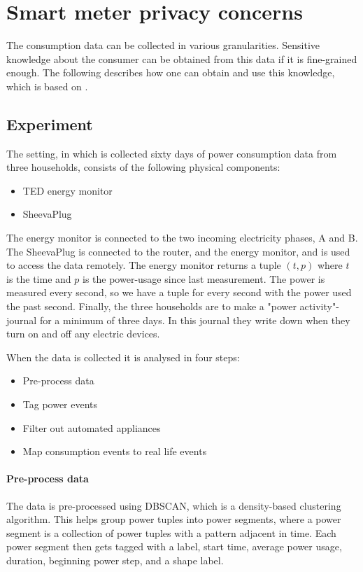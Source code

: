 \section{Smart meter privacy concerns}\label{smart_meter_privacy}
The consumption data can be collected in various granularities.
Sensitive knowledge about the consumer can be obtained from this data if it is fine-grained enough.
The following describes how one can obtain and use this knowledge, which is based on \citet{privacy_memoir}.

\subsection{Experiment}
The setting, in which is collected sixty days of power consumption data from three households, consists of the following physical components:
\begin{itemize}
\item TED energy monitor
\item SheevaPlug
\end{itemize}
The energy monitor is connected to the two incoming electricity phases, A and B.\cite{TED_installation_guide}
The SheevaPlug is connected to the router, and the energy monitor, and is used to access the data remotely.
The energy monitor returns a tuple $(t,p)$ where $t$ is the time and $p$ is the power-usage since last measurement.
The power is measured every second, so we have a tuple for every second with the power used the past second.
Finally, the three households are to make a "power activity"-journal for a minimum of three days.
In this journal they write down when they turn on and off any electric devices.

When the data is collected it is analysed in four steps:
\begin{itemize}
\item Pre-process data
\item Tag power events
\item Filter out automated appliances
\item Map consumption events to real life events
\end{itemize}

\paragraph{Pre-process data}
The data is pre-processed using DBSCAN, which is a density-based clustering algorithm.
This helps group power tuples into power segments, where a power segment is a collection of power tuples with a pattern adjacent in time.
Each power segment then gets tagged with a label, start time, average power usage, duration, beginning power step, and a shape label.

